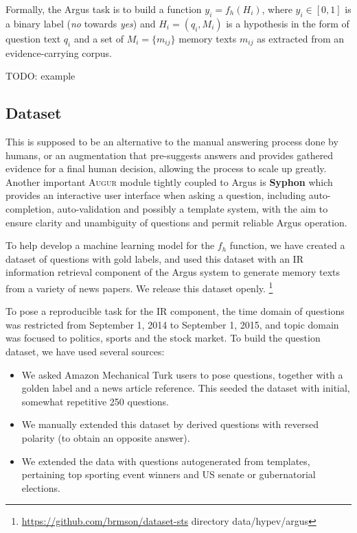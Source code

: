 \documentclass[11pt]{article}
\begin{document}
Formally, the Argus task is to build a function $y_i = f_h(H_i)$,
where $y_i \in [0,1]$ is a binary label (\textit{no} towards \textit{yes})
and $H_i = (q_i, M_i)$ is a hypothesis in the form of question text $q_i$
and a set of $M_i = \{m_{ij}\}$ memory texts $m_{ij}$ as extracted
from an evidence-carrying corpus.

TODO: example


\subsection{Dataset}

This is supposed
to be an alternative to the manual answering process done by humans,
or an augmentation that pre-suggests answers and provides gathered
evidence for a final human decision, allowing the process to scale
up greatly.  Another important \textsc{Augur} module tightly
coupled to Argus is \textbf{Syphon} which provides an interactive
user interface when asking a question, including auto-completion,
auto-validation and possibly a template system, with the aim to
ensure clarity and unambiguity of questions and permit reliable
Argus operation.


To help develop a machine learning model for the $f_h$ function,
we have created a dataset of questions with gold labels, and used
this dataset with an IR information retrieval component of the Argus
system to generate memory texts from a variety of news papers.
We release this dataset openly.%
\footnote{\url{https://github.com/brmson/dataset-sts} directory data/hypev/argus}

To pose a reproducible task for the IR component, the time domain
of questions was restricted from September 1, 2014 to September 1, 2015,
and topic domain was focused to politics, sports and the stock market.
To build the question dataset, we have used several sources:
\begin{itemize}
	\item We asked Amazon Mechanical Turk users to pose questions, together with a golden label and a news article reference.
		This seeded the dataset with initial, somewhat repetitive 250 questions.
	\item We manually extended this dataset by derived questions with reversed polarity (to obtain an opposite answer).
	\item We extended the data with questions autogenerated from templates, pertaining top sporting event winners and US senate or gubernatorial elections.
\end{itemize}
\end{document}
